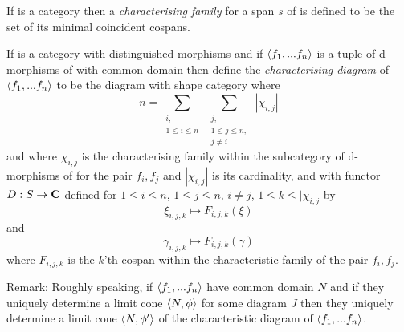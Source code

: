 \documentclass[10pt,a4paper]{scrartcl}
\begin{document}
\begin{definition}
\noindent If  is a category  then a \textit{characterising family} for a span $s$ of  is defined to be the set of its minimal coincident cospans.
\end{definition}


\noindent 

\begin{definition}
If  is a category with distinguished morphisms 
and if $\langle f_1,...f_n\rangle$ is a tuple of d-morphisms of  
with common domain then define the \textit{characterising diagram} of 
$\langle f_1,...f_n\rangle$
to be the diagram with shape category \ndidly where 
$$n = 
\sum_{\substack{i,\\1 \leq i \leq n}} \  \sum_{\substack{j,\\ 1 \leq j \leq n,\\ j \neq i}} \ | \chi_{i,j} | $$
and where $\chi_{i,j}$ is the characterising family within the subcategory 
of d-morphisms of  for the pair $f_i,f_j$ and 
$|\chi_{i,j}|$ is its cardinality,
and with functor $D: S \rightarrow \textbf{C}$ defined for $1 \leq i \leq n$, $1 \leq j \leq n$, $i \neq j$, $1 \leq k \leq | \chi_{i,j}$ by
$$ \xi_{i,j,k}   \mapsto F_{i,j,k}(\xi)$$
and
$$ \gamma_{i,j,k}   \mapsto F_{i,j,k}(\gamma) $$
where $F_{i,j,k}$ is the $k$'th cospan within the characteristic family of the pair $f_i,f_j$.
\end{definition}

\noindent
Remark: Roughly speaking, if $\langle f_1,...f_n\rangle$ have common domain $N$
and if they uniquely determine a limit cone $\langle N,\phi\rangle$ for some diagram $J$  then they uniquely determine a limit cone $\langle N,\phi'\rangle$
 of the characteristic diagram of $\langle f_1,...f_n\rangle$.
\end{document}
